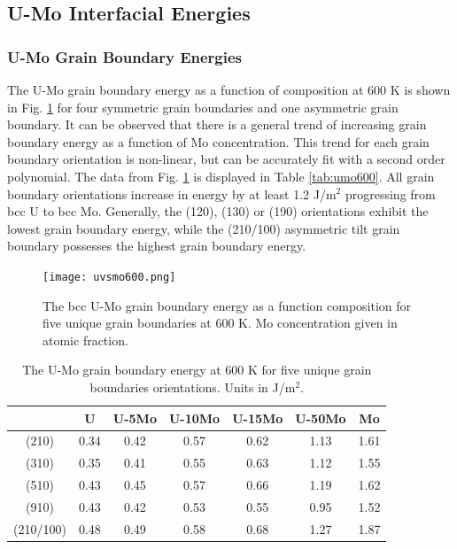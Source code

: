 \documentclass[review]{elsarticle}
\begin{document}
\FloatBarrier

\subsection{U-Mo Interfacial Energies}
\subsubsection{U-Mo Grain Boundary Energies}

The U-Mo grain boundary energy as a function of composition at 600 K is shown in Fig. \ref{fig:umo600} for four symmetric grain boundaries and one asymmetric grain boundary. It can be observed that there is a general trend of increasing grain boundary energy as a function of Mo concentration. This trend for each grain boundary orientation is non-linear, but can be accurately fit with a second order polynomial. The data from Fig. \ref{fig:umo600} is displayed in Table \ref{tab:umo600}. All grain boundary orientations increase in energy by at least 1.2 J/m$^{2}$ progressing from bcc U to bcc Mo. Generally, the (120), (130) or (190) orientations exhibit the lowest grain boundary energy, while the (210/100) asymmetric tilt grain boundary possesses the highest grain boundary energy. 

\begin{figure}[h]
 \centering
 \texttt{[image: uvsmo600.png]} 
 \caption{The bcc U-Mo grain boundary energy as a function composition for five unique grain boundaries at 600 K. Mo concentration given in atomic fraction.}
 \label{fig:umo600}
\end{figure}

\FloatBarrier

\begin{table}[h]
\caption{The U-Mo grain boundary energy at 600 K for five unique grain boundaries orientations. Units in J/m$^{2}$. } \label{tab:umo600}
\begin{center}
\begin{tabular}{|c|c|c|c|c|c|c|}
	\hline
 & U & U-5Mo & U-10Mo & U-15Mo & U-50Mo & Mo \\
\hline
(210) & 0.34 & 0.42 & 0.57 & 0.62 & 1.13 & 1.61 \\
(310) & 0.35 & 0.41 & 0.55 & 0.63 & 1.12 & 1.55 \\ 
(510) & 0.43 & 0.45 & 0.57 & 0.66 & 1.19 & 1.62 \\ 
(910)	 & 0.43 & 0.42 & 0.53 & 0.55 & 0.95 & 1.52 \\ 
(210/100) & 0.48 & 0.49 & 0.58 & 0.68 & 1.27 & 1.87 \\
 	 \hline
\end{tabular}
\end{center}
\label{default}
\end{table}
\end{document}
